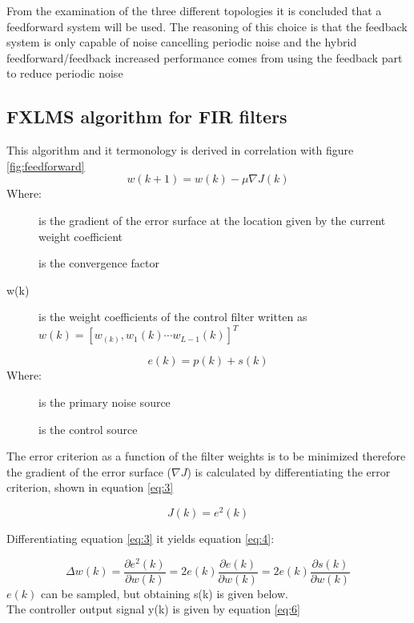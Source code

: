 From the examination of the three different topologies it is concluded that a feedforward system will be used. The reasoning of this choice is that the feedback system is only capable of noise cancelling periodic noise and the hybrid feedforward/feedback increased performance comes from using the feedback part to reduce periodic noise   


\subsection*{FXLMS algorithm for FIR filters}\label{subsec:fxlms}

This algorithm and it termonology is derived in correlation with figure \ref{fig:feedforward}
\begin{equation}\label{eq:1}
w(k+1) = w(k) - \mu\nabla J(k)
\end{equation}
Where:
\begin{description}
	\item[] is the gradient of the error surface at the location given by the current weight coefficient
	\item[\text{$\mu$}] is the convergence factor
	\item[w(k)] is the weight coefficients of the control filter written as  $w(k)=[w_(k),w_1(k) \cdots w_{L-1}(k)]^T$
\end{description}

\begin{equation}\label{eq:2}
e(k) = p(k) + s(k)
\end{equation}
Where:
\begin{description}
	\item[] is the primary noise source
	\item[] is the control source
\end{description}

The error criterion as a function of the filter weights is to be minimized therefore the gradient of the error surface ($\nabla J$) is calculated by differentiating the error criterion, shown in equation \ref{eq:3} 

\begin{equation}\label{eq:3}
J(k) = e^2(k)
\end{equation}

Differentiating equation \ref{eq:3} it yields equation \ref{eq:4}:

\begin{equation}\label{eq:4}
\Delta w(k) = \frac{\partial e^2(k)}{\partial w(k)} = 2e(k)\frac{\partial e(k)}{\partial w(k)} = 2e(k)\frac{\partial s(k)}{\partial w(k)}
\end{equation}
$e(k)$ can be sampled, but obtaining s(k) is given below. \\
The controller output signal y(k) is given by equation \ref{eq:6} 

